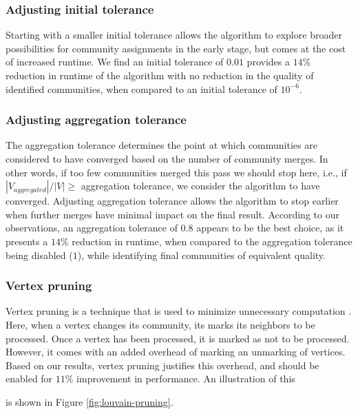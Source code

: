\subsubsection{Adjusting initial tolerance}

Starting with a smaller initial tolerance allows the algorithm to explore broader possibilities for community assignments in the early stage, but comes at the cost of increased runtime. We find an initial tolerance of $0.01$ provides a $14\%$ reduction in runtime of the algorithm with no reduction in the quality of identified communities, when compared to an initial tolerance of $10^{-6}$.


\subsubsection{Adjusting aggregation tolerance}

The aggregation tolerance determines the point at which communities are considered to have converged based on the number of community merges. In other words, if too few communities merged this pass we should stop here, i.e., if $|V_{aggregated}|/|V| \geq$ aggregation tolerance, we consider the algorithm to have converged. Adjusting aggregation tolerance allows the algorithm to stop earlier when further merges have minimal impact on the final result. According to our observations, an aggregation tolerance of $0.8$ appears to be the best choice, as it presents a $14\%$ reduction in runtime, when compared to the aggregation tolerance being disabled ($1$), while identifying final communities of equivalent quality.


\subsubsection{Vertex pruning}

Vertex pruning is a technique that is used to minimize unnecessary computation \cite{com-ryu16, com-ozaki16, com-zhang21, com-shi21}. Here, when a vertex changes its community, its marks its neighbors to be processed. Once a vertex has been processed, it is marked as not to be processed. However, it comes with an added overhead of marking an unmarking of vertices. Based on our results, vertex pruning justifies this overhead, and should be enabled for $11\%$ improvement in performance. An illustration of this is shown in Figure \ref{fig:louvain-pruning}.




